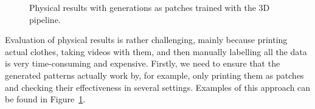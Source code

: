 \begin{figure}[htp]
\hfill
{}\hfill
{}
\caption{Physical results with generations as patches trained with the 3D pipeline.}\label{physical_patches}
\end{figure}
 
Evaluation of physical results is rather challenging, mainly because printing actual clothes, taking videos with them, and then manually labelling all the data is very time-consuming and expensive.
Firstly, we need to ensure that the generated patterns actually work by, for example, only printing them as patches and checking their effectiveness in several settings. 
Examples of this approach can be found in Figure~\ref{physical_patches}.

